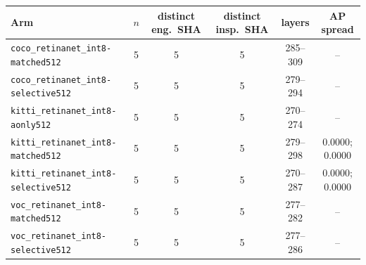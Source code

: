 \begin{tabular}{lccccc}
\toprule
Arm & $n$ & distinct eng.~SHA & distinct insp.~SHA & layers & AP spread \\
\midrule
\texttt{coco\_retinanet\_int8-matched512} & 5 & 5 & 5 & 285--309 & -- \\
\texttt{coco\_retinanet\_int8-selective512} & 5 & 5 & 5 & 279--294 & -- \\
\texttt{kitti\_retinanet\_int8-aonly512} & 5 & 5 & 5 & 270--274 & -- \\
\texttt{kitti\_retinanet\_int8-matched512} & 5 & 5 & 5 & 279--298 & 0.0000; 0.0000 \\
\texttt{kitti\_retinanet\_int8-selective512} & 5 & 5 & 5 & 270--287 & 0.0000; 0.0000 \\
\texttt{voc\_retinanet\_int8-matched512} & 5 & 5 & 5 & 277--282 & -- \\
\texttt{voc\_retinanet\_int8-selective512} & 5 & 5 & 5 & 277--286 & -- \\
\bottomrule
\end{tabular}
